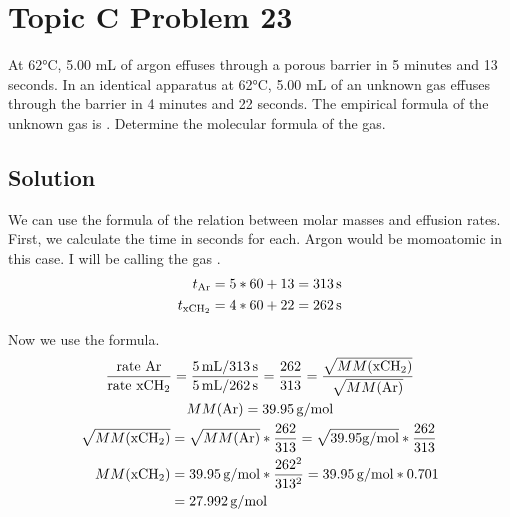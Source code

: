 \documentclass[10pt]{article}
\begin{document}
    \pagebreak
    \section{Topic C Problem 23}
        At 62\unit{\celsius}, 5.00 mL of argon effuses through a porous barrier in 5 minutes and 13 seconds. 
        In an identical apparatus at 62\unit{\celsius}, 5.00 mL of an unknown gas effuses through the barrier in 4 minutes and 22 seconds. 
        The empirical formula of the unknown gas is . 
        Determine the molecular formula of the gas.

        \subsection{Solution}
            We can use the formula of the relation between molar masses and effusion rates.
            First, we calculate the time in seconds for each.
            Argon would be momoatomic in this case. 
            I will be calling the gas .
            \begin{align}
                t_{\ce{Ar}} &=  5 * 60 + 13
                    =   313\,\unit{\second}\\
                t_{\ce{xCH2}}&=  4 * 60 + 22
                    =   262\,\unit{\second}
            \end{align}

            Now we use the formula.
            \begin{gather}
                \frac{\text{rate \ce{Ar}}}{\text{rate \ce{xCH2}}}    =   \frac{5\,\unit{\milli\liter}/313\,\unit{\second}}{5\,\unit{\milli\liter}/262\,\unit{\second}}
                    =   \frac{262}{313}
                    =   \frac{\sqrt{MM(\ce{xCH2})}}{\sqrt{MM(\ce{Ar})}}\\
                MM(\ce{Ar}) =   39.95\,\unit{\gram/\mole}\\
                \begin{align}
                    \sqrt{MM(\ce{xCH2})} &=  \sqrt{MM(\ce{Ar})} * \frac{262}{313}
                        =   \sqrt{39.95\unit{\gram/\mole}} * \frac{262}{313}\\
                    MM(\ce{xCH2})    &=  39.95\,\unit{\gram/\mole} * \frac{262^2}{313^2}
                        =   39.95\,\unit{\gram/\mole} * 0.701\\
                        &=  27.992\,\unit{\gram/\mole}
                \end{align}
            \end{gather}
\end{document}
